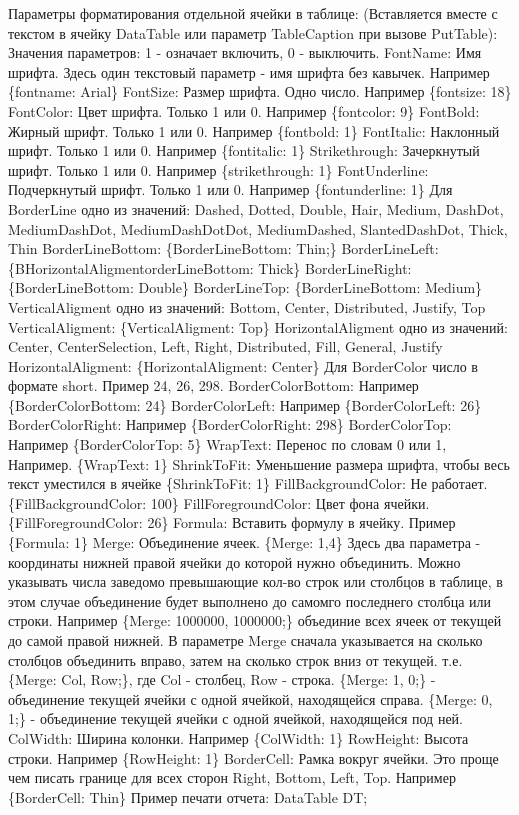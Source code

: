 Параметры форматирования отдельной ячейки в таблице\+: (Вставляется вместе с текстом в ячейку Data\+Table или параметр Table\+Caption при вызове Put\+Table)\+: Значения параметров\+: 1 -\/ означает включить, 0 -\/ выключить. Font\+Name\+: Имя шрифта. Здесь один текстовый параметр -\/ имя шрифта без кавычек. Например \{fontname\+: Arial\} Font\+Size\+: Размер шрифта. Одно число. Например \{fontsize\+: 18\} Font\+Color\+: Цвет шрифта. Только 1 или 0. Например \{fontcolor\+: 9\} Font\+Bold\+: Жирный шрифт. Только 1 или 0. Например \{fontbold\+: 1\} Font\+Italic\+: Наклонный шрифт. Только 1 или 0. Например \{fontitalic\+: 1\} Strikethrough\+: Зачеркнутый шрифт. Только 1 или 0. Например \{strikethrough\+: 1\} Font\+Underline\+: Подчеркнутый шрифт. Только 1 или 0. Например \{fontunderline\+: 1\} Для Border\+Line одно из значений\+: Dashed, Dotted, Double, Hair, Medium, Dash\+Dot, Medium\+Dash\+Dot, Medium\+Dash\+Dot\+Dot, Medium\+Dashed, Slanted\+Dash\+Dot, Thick, Thin Border\+Line\+Bottom\+: \{Border\+Line\+Bottom\+: Thin;\} Border\+Line\+Left\+: \{B\+Horizontal\+Aligmentorder\+Line\+Bottom\+: Thick\} Border\+Line\+Right\+: \{Border\+Line\+Bottom\+: Double\} Border\+Line\+Top\+: \{Border\+Line\+Bottom\+: Medium\} Vertical\+Aligment одно из значений\+: Bottom, Center, Distributed, Justify, Top Vertical\+Aligment\+: \{Vertical\+Aligment\+: Top\} Horizontal\+Aligment одно из значений\+: Center, Center\+Selection, Left, Right, Distributed, Fill, General, Justify Horizontal\+Aligment\+: \{Horizontal\+Aligment\+: Center\} Для Border\+Color число в формате short. Пример 24, 26, 298. Border\+Color\+Bottom\+: Например \{Border\+Color\+Bottom\+: 24\} Border\+Color\+Left\+: Например \{Border\+Color\+Left\+: 26\} Border\+Color\+Right\+: Например \{Border\+Color\+Right\+: 298\} Border\+Color\+Top\+: Например \{Border\+Color\+Top\+: 5\} Wrap\+Text\+: Перенос по словам 0 или 1, Например. \{Wrap\+Text\+: 1\} Shrink\+To\+Fit\+: Уменьшение размера шрифта, чтобы весь текст уместился в ячейке \{Shrink\+To\+Fit\+: 1\} Fill\+Background\+Color\+: Не работает. \{Fill\+Background\+Color\+: 100\} Fill\+Foreground\+Color\+: Цвет фона ячейки. \{Fill\+Foreground\+Color\+: 26\} Formula\+: Вставить формулу в ячейку. Пример \{Formula\+: 1\} Merge\+: Объединение ячеек. \{Merge\+: 1,4\} Здесь два параметра -\/ координаты нижней правой ячейки до которой нужно объединить. Можно указывать числа заведомо превышающие кол-\/во строк или столбцов в таблице, в этом случае объединение будет выполнено до самомго последнего столбца или строки. Например \{Merge\+: 1000000, 1000000;\} объединие всех ячеек от текущей до самой правой нижней. В параметре Merge сначала указывается на сколько столбцов объединить вправо, затем на сколько строк вниз от текущей. т.\+е. \{Merge\+: Col, Row;\}, где Col -\/ столбец, Row -\/ строка. \{Merge\+: 1, 0;\} -\/ объединение текущей ячейки с одной ячейкой, находящейся справа. \{Merge\+: 0, 1;\} -\/ объединение текущей ячейки с одной ячейкой, находящейся под ней. Col\+Width\+: Ширина колонки. Например \{Col\+Width\+: 1\} Row\+Height\+: Высота строки. Например \{Row\+Height\+: 1\} Border\+Cell\+: Рамка вокруг ячейки. Это проще чем писать границе для всех сторон Right, Bottom, Left, Top. Например \{Border\+Cell\+: Thin\} Пример печати отчета\+: Data\+Table DT; 